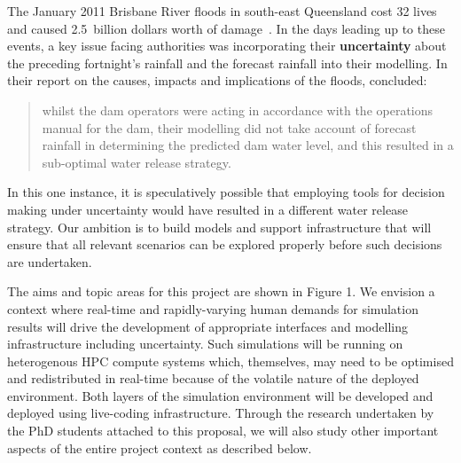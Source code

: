 The January 2011 Brisbane River floods in south-east Queensland cost
32 lives and caused 2.5~billion dollars worth of
damage~\parencite{vandenhonert2011}. In the days leading up to these
events, a key issue facing authorities was incorporating their
\textbf{uncertainty} about the preceding fortnight's rainfall and the
forecast rainfall into their modelling. In their report on the causes,
impacts and implications of the floods, \cite{vandenhonert2011}
concluded:
\blockquote{whilst the dam operators were acting in accordance with
  the operations manual for the dam, their modelling did not take
  account of forecast rainfall in determining the predicted dam water
  level, and this resulted in a sub-optimal water release strategy.
  } 
In this one instance, it is speculatively possible that employing tools 
for decision making under uncertainty would have
resulted in a different water release strategy. Our ambition is to build models 
and support infrastructure that will ensure that all relevant scenarios
can be explored properly before such decisions are undertaken.

The aims and topic areas for this project are
 shown in Figure 1. We envision a context where real-time and rapidly-varying human demands for 
 simulation results will drive the development of appropriate interfaces and modelling infrastructure including uncertainty. 
 Such simulations will be running on heterogenous HPC compute systems which, themselves, may need to be optimised and redistributed in real-time because of the volatile nature of the deployed environment. Both layers of the simulation environment will be developed and deployed using live-coding infrastructure. Through the research undertaken by the PhD students attached to this proposal, we will also study other important aspects of the entire project context as described below. 
 
 
